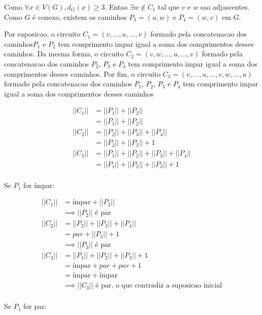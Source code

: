 \documentclass{article}
\begin{document}
Como $\forall x \in V(G), d_G(x) \geq 3 $. Entao $\exists w \notin C_1$ tal que $v$ e $w$ sao adjascentes. Como $G$ é conexo, existem os caminhos $P_3 = (u,w)$ e $P_4 = (w,v)$ em $G$.

Por suposicao, o circuito $C_1 = (v,...,u,...,v)$ formado pela concatenacao dos caminhos$P_1$ e $P_2$ tem comprimento impar igual a soma dos comprimentos desses caminhos. Da mesma forma, o circuito $C_2 = (v,w,...,u,...,v)$ formado pela concatenacao dos caminhos $P_2$, $P_3$ e $P_4$ tem comprimento impar igual a soma dos comprimentos desses caminhos. Por fim, o circuito $C_3 = (v,...,u,...,v,w,...,u)$ formado pela concatenacao dos caminhos $P_1$, $P_2$, $P_3$ e $P_4$ tem comprimento impar igual a soma dos comprimentos desses caminhos

\begin{align}
    ||C_1|| &= ||P_1|| + ||P_2|| \\
                &= ||P_1|| + ||P_2|| \\
    ||C_2|| &= ||P_2|| + ||P_3|| + ||P_4|| \\
                &= ||P_2|| + ||P_3||  + 1 \\
  	||C_3|| &= ||P_1|| + ||P_2|| + ||P_3||  + ||P_4|| \\  
  	           &= ||P_1|| + ||P_2|| + ||P_3||  + 1  \\  
\end{align}

Se $P_1$ for ímpar:

\begin{align}
	||C_1|| &= \text{ímpar} + ||P_2|| \\
	&\implies ||P_2|| \text{  é par} \\
	||C_2|| &= ||P_2|| + ||P_3|| + ||P_4|| \\
	&= par + ||P_3||  + 1 \\
	&\implies ||P_3|| \text{   é par} \\
	||C_3|| &= ||P_1|| + ||P_2|| + ||P_3||  +1 \\  
               &= \text{ímpar} + par + par  +1 \\  
               &= \text{ímpar} + \text{ímpar}  \\  
                &\implies 	||C_3|| \text{   é par, o que contradiz a suposicao inicial} \\  
\end{align}


Se $P_1$ for par:
\end{document}
